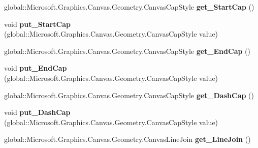 \begin{DoxyCompactItemize}
global\+::\+Microsoft.\+Graphics.\+Canvas.\+Geometry.\+Canvas\+Cap\+Style {\bfseries get\+\_\+\+Start\+Cap} ()
\item 
\mbox{\label{class_microsoft_1_1_graphics_1_1_canvas_1_1_geometry_1_1_canvas_stroke_style_a7d8f82f4ff8e2d65759fc7359e698584}} 
void {\bfseries put\+\_\+\+Start\+Cap} (global\+::\+Microsoft.\+Graphics.\+Canvas.\+Geometry.\+Canvas\+Cap\+Style value)
\item 
\mbox{\label{class_microsoft_1_1_graphics_1_1_canvas_1_1_geometry_1_1_canvas_stroke_style_ab89db4f7c48a94cfd80ea551415cd2f0}} 
global\+::\+Microsoft.\+Graphics.\+Canvas.\+Geometry.\+Canvas\+Cap\+Style {\bfseries get\+\_\+\+End\+Cap} ()
\item 
\mbox{\label{class_microsoft_1_1_graphics_1_1_canvas_1_1_geometry_1_1_canvas_stroke_style_a7b6afd8e63542d3d893b8ba1dba200df}} 
void {\bfseries put\+\_\+\+End\+Cap} (global\+::\+Microsoft.\+Graphics.\+Canvas.\+Geometry.\+Canvas\+Cap\+Style value)
\item 
\mbox{\label{class_microsoft_1_1_graphics_1_1_canvas_1_1_geometry_1_1_canvas_stroke_style_a4ed5fa2a457de0566e9deccd86297f66}} 
global\+::\+Microsoft.\+Graphics.\+Canvas.\+Geometry.\+Canvas\+Cap\+Style {\bfseries get\+\_\+\+Dash\+Cap} ()
\item 
\mbox{\label{class_microsoft_1_1_graphics_1_1_canvas_1_1_geometry_1_1_canvas_stroke_style_af6dd55589d9a2841f19982e1102a37a3}} 
void {\bfseries put\+\_\+\+Dash\+Cap} (global\+::\+Microsoft.\+Graphics.\+Canvas.\+Geometry.\+Canvas\+Cap\+Style value)
\item 
\mbox{\label{class_microsoft_1_1_graphics_1_1_canvas_1_1_geometry_1_1_canvas_stroke_style_af2b4659e4328e98df4216b6cfc29404c}} 
global\+::\+Microsoft.\+Graphics.\+Canvas.\+Geometry.\+Canvas\+Line\+Join {\bfseries get\+\_\+\+Line\+Join} ()
\item 

\end{DoxyCompactItemize}
